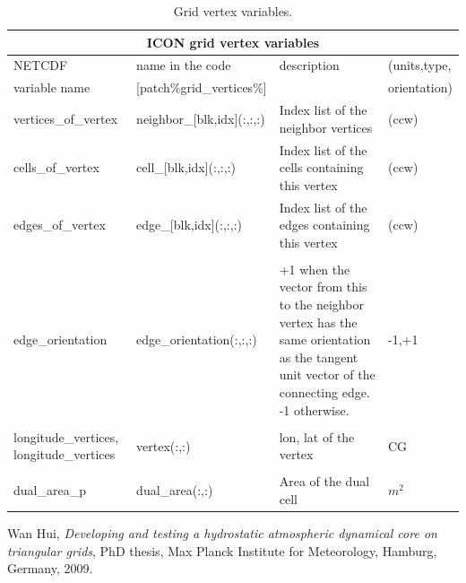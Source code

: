 \documentclass[a4paper,11pt,DIV16,BCOR1cm,titlepage]{scrartcl}
\begin{document}
\begin{table}[htdp]
\small
\begin{center}
\begin{tabular}{|m{3.2cm}|m{3.3cm}|m{6.8cm}|m{1.6cm}|}
\hline
\multicolumn{4}{|c|}{\textbf{ICON grid vertex variables}}\\ \hline
NETCDF         & name in the code        & description & (units,type,    \\ 
variable name  & [patch\%grid\_vertices\%]  &          &  orientation)    \\ 
\hline\hline
vertices\_of\_vertex  & neighbor\_[blk,idx](:,:,:)  & Index list of the neighbor vertices         & (ccw)\\
cells\_of\_vertex  & cell\_[blk,idx](:,:,:)   & Index list of the cells containing this vertex    & (ccw)\\
edges\_of\_vertex  & edge\_[blk,idx](:,:,:)   & Index list of the edges containing this vertex    & (ccw)\\
 & & & \\
edge\_orientation & edge\_orientation(:,:,:) & 
+1 when the vector from this to the neighbor vertex has the same orientation as the 
tangent unit vector of the connecting edge.
-1 otherwise.
& -1,+1 \\
 & & &   \\
longitude\_vertices, longitude\_vertices & vertex(:,:) & lon, lat of the vertex & CG \\
 & & & \\
dual\_area\_p & dual\_area(:,:) & Area of the dual cell & $m^2$ \\
\hline
\end{tabular}
\caption{Grid vertex variables.}\label{tbl:grid_vertex_variables}
\end{center}
\end{table}

\clearpage
\newpage


\begin{thebibliography}{9}

    Wan Hui, 
    \emph{Developing and testing a hydrostatic atmospheric dynamical core 
    on triangular grids}, PhD thesis, 
    Max Planck Institute for Meteorology,
    Hamburg, Germany,
    2009.

\end{thebibliography}
  
\end{document}
